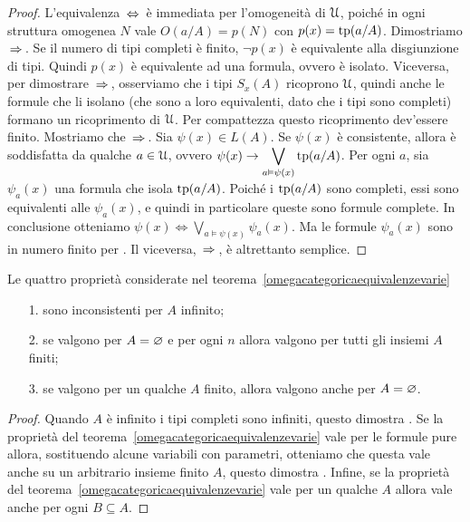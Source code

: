 \begin{proof} L'equivalenza $\,\Leftrightarrow\,$ \`e immediata per l'omogeneit\`a di $\EuScript U$, poich\'e in ogni struttura omogenea $N$ vale $O(a/A)=p(N)$ con $p(x)=\textrm{tp}(a/A)$. Dimostriamo $\,\Rightarrow\,$. Se il numero di tipi completi \`e finito, $\neg p(x)$ \`e equivalente alla disgiunzione di tipi. Quindi $p(x)$ \`e equivalente ad una formula, ovvero \`e isolato.  Viceversa, per dimostrare $\,\Rightarrow\,$, osserviamo che i tipi $S_x(A)$ ricoprono $\EuScript U$, quindi anche le formule che li isolano (che sono a loro equivalenti, dato che i tipi sono completi) formano un ricoprimento di $\EuScript U$. Per compattezza questo ricoprimento dev'essere finito. Mostriamo che $\,\Rightarrow\,$. 
Sia $\psi(x) \in L(A)$. Se $\psi(x)$ \`e consistente, allora \`e soddisfatta da qualche $a \in \EuScript U$, ovvero $\displaystyle \psi(x) \rightarrow \bigvee_{a \vDash \psi(x)} \textrm{tp}(a/A)$. Per ogni $a$, sia $\psi_{\!a}(x)$ una formula che isola $\textrm{tp}(a/A)$. Poich\'e i $\textrm{tp}(a/A)$ sono completi, essi sono equivalenti alle $\psi_{\!a}(x)$, e quindi in particolare queste sono formule complete. In conclusione otteniamo $\displaystyle \psi(x) \iff \bigvee_{a \models \psi(x)} \psi_{\!a}(x)$. Ma le formule $\psi_{\!a}(x)$ sono in numero finito per . Il viceversa, $\,\Rightarrow\,$, \`e altrettanto semplice.
\end{proof}

\begin{corollary}  Le quattro propriet\`a considerate nel teorema~\ref{omegacategoricaequivalenzevarie}
\begin{itemize}
\item[1.] sono inconsistenti per $A$ infinito;
\item[2.] se valgono per $A=\varnothing$ e per ogni $n$ allora valgono per tutti gli insiemi $A$ finiti; 
\item[3.] se valgono per un qualche $A$ finito, allora valgono anche per $A=\varnothing$.
\end{itemize}
\end{corollary}

\begin{proof} Quando $A$ \`e infinito i tipi completi sono infiniti, questo dimostra . Se la propriet\`a  del teorema~\ref{omegacategoricaequivalenzevarie} vale per le formule pure allora, sostituendo alcune variabili con parametri, otteniamo che questa vale anche su un arbitrario insieme finito $A$, questo dimostra . Infine, se la propriet\`a  del teorema~\ref{omegacategoricaequivalenzevarie} vale per un qualche $A$ allora vale anche per ogni $B\subseteq A$.
\end{proof}


